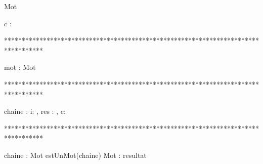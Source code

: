 \begin{algorithme}
    
    \begin{enregistrement}{Mot}%
    \end{enregistrement}

      {c : \caractere}%
      {\booleen}%
      {}%
      {
      }
\end{algorithme}

***********************************************************************************
\begin{algorithme}
       {mot : Mot}%
       {\entier}%
       {}%
       {
         

        }
\end{algorithme}

***********************************************************************************
\begin{algorithme}
     {chaine : \chaine}%
     {\booleen}%
     {i: \entier, res : \booleen, c: \caractere}%
     {     

        	{
        	}%
        	{

			   {
				  {
				  }%
		           }%
                }%
        
      }
  
\end{algorithme}

***********************************************************************************
\begin{algorithme}
    {chaine : \chaine}%
    {Mot}%
    {estUnMot(chaine)}%
    {Mot : resultat}%
    {
    }
\end{algorithme}

